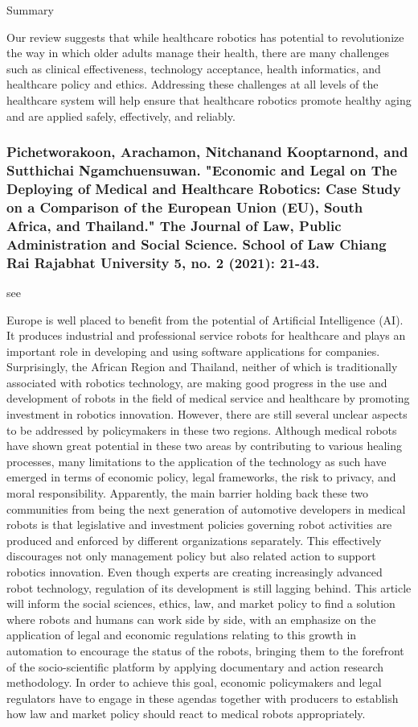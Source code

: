 \documentclass[conference]{IEEEtran}
\begin{document}
Summary

Our review suggests that while healthcare robotics has potential to revolutionize the way in which older adults manage their health, there are many challenges such as clinical effectiveness, technology acceptance, health informatics, and healthcare policy and ethics. Addressing these challenges at all levels of the healthcare system will help ensure that healthcare robotics promote healthy aging and are applied safely, effectively, and reliably.

\medskip
\subsubsection{Pichetworakoon, Arachamon, Nitchanand Kooptarnond, and Sutthichai Ngamchuensuwan. "Economic and Legal on The Deploying of Medical and Healthcare Robotics: Case Study on a Comparison of the European Union (EU), South Africa, and Thailand." The Journal of Law, Public Administration and Social Science. School of Law Chiang Rai Rajabhat University 5, no. 2 (2021): 21-43.}
see \cite{pichetworakoon2021economic}

Europe is well placed to benefit from the potential of Artificial Intelligence (AI). It produces industrial and professional service robots for healthcare and plays an important role in developing and using software applications for companies. Surprisingly, the African Region and Thailand, neither of which is traditionally associated with robotics technology, are making good progress in the use and development of robots in the field of medical service and healthcare by promoting investment in robotics innovation. However, there are still several unclear aspects to be addressed by policymakers in these two regions. Although medical robots have shown great potential in these two areas by contributing to various healing processes, many limitations to the application of the technology as such have emerged in terms of economic policy, legal frameworks, the risk to privacy, and moral responsibility. Apparently, the main barrier holding back these two communities from being the next generation of automotive developers in medical robots is that legislative and investment policies governing robot activities are produced and enforced by different organizations separately. This effectively discourages not only management policy but also related action to support robotics innovation. Even though experts are creating increasingly advanced robot technology, regulation of its development is still lagging behind. This article will inform the social sciences, ethics, law, and market policy to find a solution where robots and humans can work side by side, with an emphasize on the application of legal and economic regulations relating to this growth in automation to encourage the status of the robots, bringing them to the forefront of the socio-scientific platform by applying documentary and action research methodology. In order to achieve this goal, economic policymakers and legal regulators have to engage in these agendas together with producers to establish how law and market policy should react to medical robots appropriately.
\end{document}
